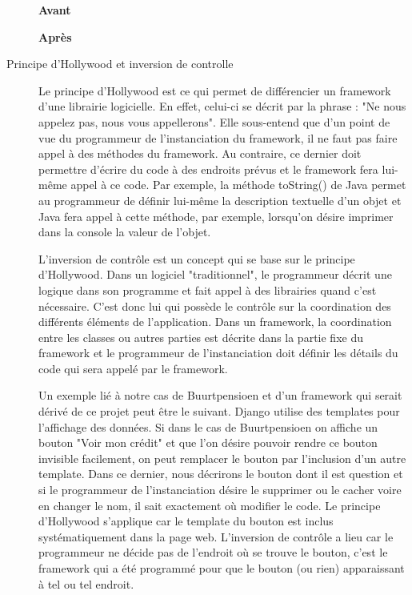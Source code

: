 \begin{description}
\begin{minipage}{.5\textwidth}
\begin{center} \textbf{Avant}


\end{center}
\end{minipage}
\hspace{0.3cm}
\begin{minipage}{.5\textwidth}
\begin{center} \textbf{Après}\end{center}


\end{minipage}
\vspace{0.3cm}


\item[Principe d'Hollywood et inversion de controlle]
Le principe d'Hollywood est ce qui permet de différencier un framework d'une librairie logicielle.  En effet,  celui-ci se décrit par la phrase : "Ne nous appelez pas,  nous vous appellerons".  Elle sous-entend que d'un point de vue du programmeur de l'instanciation du framework,   il ne faut pas faire appel à des méthodes du framework.  Au contraire,  ce dernier doit permettre d'écrire du code à des endroits prévus et le framework fera lui-même appel à ce code.  Par exemple,  la méthode toString() de Java permet au programmeur de définir lui-même la description textuelle d'un objet et Java fera appel à cette méthode,  par exemple,  lorsqu'on désire imprimer dans la console la valeur de l'objet. 

L'inversion de contrôle est un concept qui se base sur le principe d'Hollywood.  Dans un logiciel "traditionnel",  le programmeur décrit une logique dans son programme et fait appel à des librairies quand c'est nécessaire.  C'est donc lui qui possède le contrôle sur la coordination des différents éléments de l'application.  Dans un framework,  la coordination entre les classes ou autres parties est décrite dans la partie fixe du framework et le programmeur de l'instanciation doit définir les détails du code qui sera appelé par le framework.  

Un exemple lié à notre cas de Buurtpensioen et d'un framework qui serait dérivé de ce projet peut être le suivant.  Django utilise des templates pour l'affichage des données.  Si dans le cas de Buurtpensioen on affiche un bouton "Voir mon crédit" et que l'on désire pouvoir rendre ce bouton invisible facilement,  on peut remplacer le bouton par l'inclusion d'un autre template.  Dans ce dernier,  nous décrirons le bouton dont il est question et si le programmeur de l'instanciation désire le supprimer ou le cacher voire en changer le nom,  il sait exactement où modifier le code.  Le principe d'Hollywood s'applique car le template du bouton est inclus systématiquement dans la page web.  L'inversion de contrôle a lieu car le programmeur ne décide pas de l'endroit où se trouve le bouton,  c'est le framework qui a été programmé pour que le bouton (ou rien) apparaissant à tel ou tel endroit.  


\end{description}
